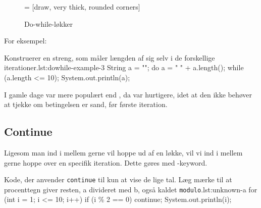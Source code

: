         \begin{figure}
        \center
         = [draw, very thick, rounded corners]
        \caption{Do-while-løkker}
        \label{fig:do-while-loop-illustrated}
        \end{figure}

		For eksempel:

		\begin{JavaCode}{Konstruerer en streng, som måler længden af sig selv i de forskellige iterationer.}{lst:dowhile-example-3}
			String a = "";
			do {
				a = " " + a.length();
			} while (a.length <= 10);
			System.out.println(a);
		\end{JavaCode}

        I gamle dage var  mere populært end
        , da  var
        hurtigere, idet at den ikke behøver at tjekke om betingelsen er
        sand, før første iteration.

	\subsection{Continue}

        Ligesom man ind i mellem gerne vil hoppe ud af en løkke, vil
        vi ind i mellem gerne hoppe over en specifik iteration. Dette
        gøres med -keyword.

        \begin{JavaCode}{Kode, der anvender \texttt{continue} til kun at vise de lige tal. Læg mærke til at procenttegn giver resten, a divideret med b, også kaldet \texttt{modulo}.}{lst:unknown-a}
			for (int i = 1; i <= 10; i++) {
				if (i \% 2 == 0)  continue;
				System.out.println(i);
			}
		\end{JavaCode}


